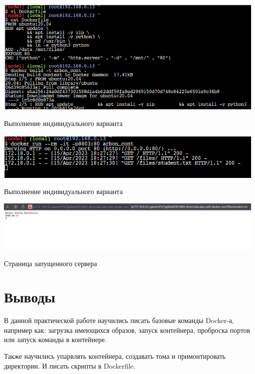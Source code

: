 \begin{image}
	\includegraphics[width=1\textwidth]{Screenshot from 2023-04-15 21-24-51}
	\caption{Выполнение индивидуального варианта}
	\label{fig:indvar}
\end{image}

\begin{image}
	\includegraphics[width=1\textwidth]{Screenshot from 2023-04-15 21-27-55}
	\caption{Выполнение индивидуального варианта}
	\label{fig:indvar:run}
\end{image}

\begin{image}
	\includegraphics[width=1\textwidth]{Screenshot from 2023-04-15 21-27-44}
	\caption{Страница запущенного сервера}
	\label{fig:indvar:page}
\end{image}

\clearpage

\section*{\LARGE Выводы}
В данной практической работе научились писать базовые команды Docker-а,
например как: загрузка имеющихся образов, запуск контейнера, проброска
портов или запуск команды в контейнере.\par
Также научились упарвлять контейнера, создавать тома и примонтировать
директории. И писать скрипты в Dockerfile.

